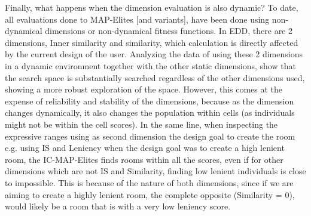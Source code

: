 Finally, what happens when the dimension evaluation is also dynamic? To date, all evaluations done to MAP-Elites [and variants], have been done using non-dynamical dimensions or non-dynamical fitness functions. In EDD, there are 2 dimensions, Inner similarity and similarity, which calculation is directly affected by the current design of the user. Analyzing the data of using these 2 dimensions in a dynamic environment together with the other static dimensions, show that the search space is substantially searched regardless of the other dimensions used, showing a more robust exploration of the space. However, this comes at the expense of reliability and stability of the dimensions, because as the dimension changes dynamically, it also changes the population within cells (as individuals might not be within the cell scores). In the same line, when inspecting the expressive ranges using as second dimension the design goal to create the room e.g. using IS and Leniency when the design goal was to create a high lenient room, the IC-MAP-Elites finds rooms within all the scores, even if for other dimensions which are not IS and Similarity, finding low lenient individuals is close to impossible. This is because of the nature of both dimensions, since if we are aiming to create a highly lenient room, the complete opposite (Similarity = 0), would likely be a room that is with a very low leniency score.
